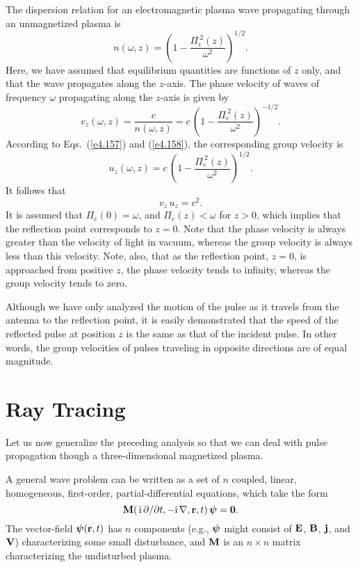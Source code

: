 The dispersion relation  for an electromagnetic plasma wave propagating
through an unmagnetized plasma is
\begin{equation}\label{e4.158}
n(\omega,z) = \left(1-\frac{{\Pi}_e^{~2}(z)}{\omega^2}\right)^{1/2}.
\end{equation}
Here, we have assumed that equilibrium quantities are functions of $z$ only,
and that the wave propagates along the $z$-axis. 
The phase velocity
of waves of frequency $\omega$
propagating along the $z$-axis is given
by
\begin{equation}
v_z(\omega,z) = \frac{c}{n(\omega,z)} = c\,\left(1-\frac{{\Pi}_e^{~2}(z)}{\omega^2}\right)^{-1/2}.
\end{equation}
According to Eqs.~(\ref{e4.157}) and (\ref{e4.158}), the corresponding group velocity
is
\begin{equation}
u_z(\omega,z) = c \,\left(1-\frac{{\Pi}_e^{~2}(z)}{\omega^2}\right)^{1/2}.
\end{equation}
It follows that
\begin{equation}
v_z\,u_z = c^2.
\end{equation}
It is assumed that ${\Pi}_e(0) = \omega$, 
and ${\Pi}_e(z) < \omega$ for $z>0$, which implies
that the reflection point corresponds to $z=0$.
Note that the phase velocity is always greater than the velocity of
light in vacuum, whereas the group velocity is always less than this
velocity.
Note, also,  that as the reflection point, $z=0$, is approached from positive $z$,
the phase velocity tends to infinity, whereas the group velocity tends
to zero.

 Although we have only analyzed the motion of the
pulse as it travels from the antenna to the reflection point, it is
easily demonstrated that the speed of the reflected pulse at position
$z$ is the same as that of the incident pulse. In other words, the group velocities
of pulses traveling in opposite directions are of equal magnitude. 

\section{Ray Tracing}
Let us now generalize the preceding analysis so that we can deal with pulse
propagation though a three-dimensional magnetized plasma.

A general wave problem can be written as a set of $n$ coupled, linear, homogeneous,
first-order, partial-differential equations, which take the form
\begin{equation}\label{e4.162}
{\bf M}(\,{\rm i}\,\partial/\partial t, -{\rm i}\,\nabla,
{\bf r}, t)\,{\mbox{\boldmath$\psi$}} = {\bf 0}.
\end{equation}
The vector-field ${\mbox{\boldmath$\psi$}}({\bf r}, t)$ has $n$ components ({e.g.}, ${\mbox{\boldmath$\psi$}}$
might consist of ${\bf E}$, ${\bf B}$, ${\bf j}$, and ${\bf V}$) characterizing
some small disturbance, and ${\bf M}$ is an $n\times n$ matrix characterizing the
undisturbed plasma. 

